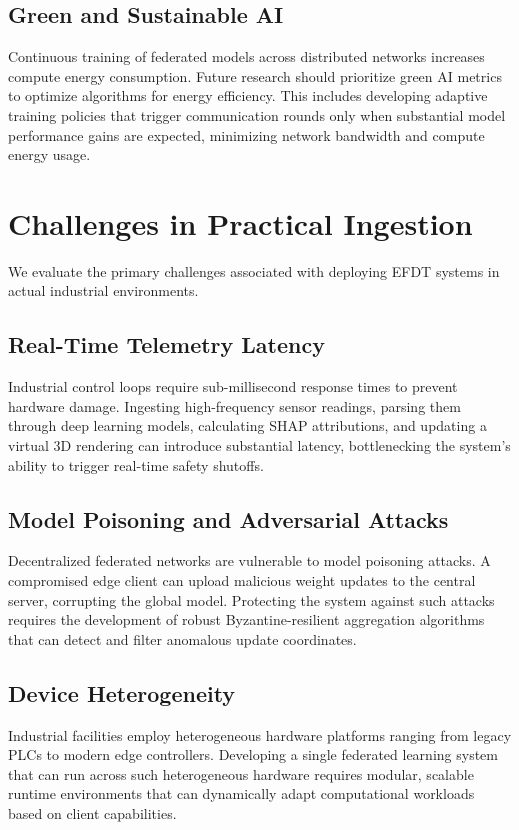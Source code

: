 \documentclass[journal,10pt,compsoc]{IEEEtran}
\begin{document}
\subsection{Green and Sustainable AI}
Continuous training of federated models across distributed networks increases compute energy consumption. Future research should prioritize green AI metrics to optimize algorithms for energy efficiency. This includes developing adaptive training policies that trigger communication rounds only when substantial model performance gains are expected, minimizing network bandwidth and compute energy usage.

\section{Challenges in Practical Ingestion}
\label{sec:challenges}

We evaluate the primary challenges associated with deploying EFDT systems in actual industrial environments.

\subsection{Real-Time Telemetry Latency}
Industrial control loops require sub-millisecond response times to prevent hardware damage. Ingesting high-frequency sensor readings, parsing them through deep learning models, calculating SHAP attributions, and updating a virtual 3D rendering can introduce substantial latency, bottlenecking the system's ability to trigger real-time safety shutoffs.

\subsection{Model Poisoning and Adversarial Attacks}
Decentralized federated networks are vulnerable to model poisoning attacks. A compromised edge client can upload malicious weight updates to the central server, corrupting the global model. Protecting the system against such attacks requires the development of robust Byzantine-resilient aggregation algorithms that can detect and filter anomalous update coordinates.

\subsection{Device Heterogeneity}
Industrial facilities employ heterogeneous hardware platforms ranging from legacy PLCs to modern edge controllers. Developing a single federated learning system that can run across such heterogeneous hardware requires modular, scalable runtime environments that can dynamically adapt computational workloads based on client capabilities.
\end{document}
